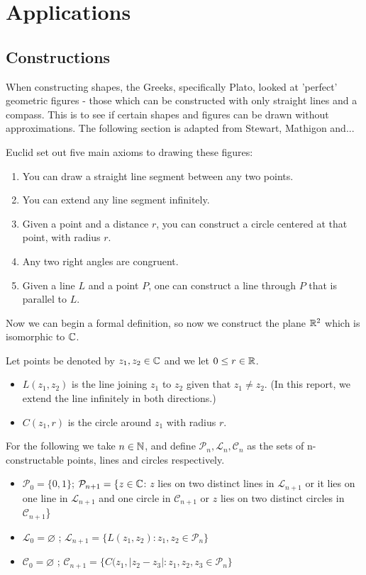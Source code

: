 \section{Applications} \label{sec:applications}

\subsection{Constructions}
When constructing shapes, the Greeks, specifically Plato, looked at 'perfect' geometric figures - those which can be constructed with only straight lines and a compass. This is to see if certain shapes and figures can be drawn without approximations. The following section is adapted from Stewart, Mathigon and...

Euclid set out five main axioms to drawing these figures:

\begin{enumerate}
    \item You can draw a straight line segment between any two points.
    \item You can extend any line segment infinitely.
    \item Given a point and a distance $r$, you can construct a circle centered at that point, with radius $r$.
    \item Any two right angles are congruent.
    \item Given a line $L$ and a point $P$, one can construct a line through $P$ that is parallel to $L$. 
\end{enumerate}

Now we can begin a formal definition, so now we construct the plane $\mathbb R^2$ which is isomorphic to $\mathbb C$. 
\begin{definition}
Let points be denoted by $z_1,z_2 \in \mathbb C$ and we let $0\leq r \in \mathbb R$.
    \begin{itemize}
        \item $L(z_1,z_2)$ is the line joining $z_1$ to $z_2$ given that $z_1 \neq z_2$. (In this report, we extend the line infinitely in both directions.)
        \item $C(z_1,r)$ is the circle around $z_1$ with radius $r$.
    \end{itemize}
    For the following we take $n \in \mathbb N$, and define $\mathcal{P}_n,\mathcal{L}_n,\mathcal{C}_n$ as the sets of n-constructable points, lines and circles respectively.
    \begin{itemize}
        \item $\mathcal{P}_0=\{0,1\}$; $\mathcal{P}_{n+1}=\{z\in \mathbb C $: $z$ lies on two distinct lines in $\mathcal{L}_{n+1}$ or it lies on one line in $\mathcal{L}_{n+1}$ and one circle in $\mathcal{C}_{n+1}$ or $z$ lies on two distinct circles in $\mathcal{C}_{n+1}$\}
        \item $\mathcal{L}_0=\varnothing$ ; $\mathcal{L}_{n+1}=\{L(z_1,z_2) : z_1,z_2\in \mathcal{P}_n\}$
        \item $\mathcal{C}_0=\varnothing$ ; $\mathcal{C}_{n+1}=\{C(z_1,|z_2-z_3|:z_1,z_2,z_3\in \mathcal{P}_n\}$
    \end{itemize}
\end{definition}

